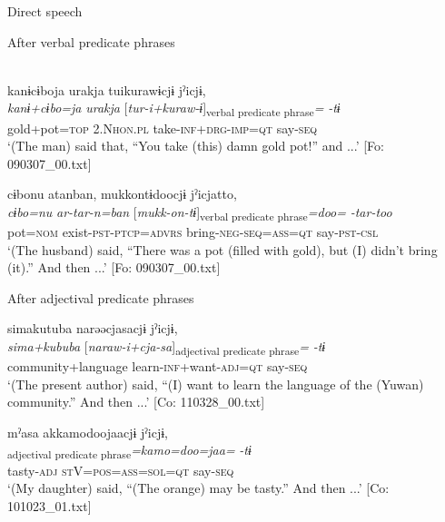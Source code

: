 \ea\label{ex:10.62}   Direct speech\\
  \begin{xlist}
  \exi{} After verbal predicate phrases

  \ex\relax [= (8-148 g)]\\
      \glll    kanɨcɨboja  urakja  tuikurawɨcjɨ  jˀicjɨ,\\
      \textit{kanɨ+cɨbo=ja}  \textit{urakja}  [\textit{tur-i+kuraw-ɨ}]\textsubscript{verbal predicate phrase}\textit{=}  \textit{-tɨ}\\
      gold+pot=\textsc{top}  2.N\textsc{hon}.\textsc{pl}  take-\textsc{inf}+\textsc{drg}-\textsc{imp}=\textsc{qt}  say-\textsc{seq}\\
      \glt       ‘(The man) said that, “You take (this) damn gold pot!” and ...’ [Fo: 090307\_00.txt]

  \ex %
      \glll    cɨbonu  atanban,  mukkontɨdoocjɨ     jˀicjatto,\\
      \textit{cɨbo=nu}  \textit{ar-tar-n=ban}  [\textit{mukk-on-tɨ}]\textsubscript{verbal predicate phrase}\textit{=doo=}   \textit{-tar-too}\\
      pot=\textsc{nom}  exist-\textsc{pst}-\textsc{ptcp}=\textsc{advrs}  bring-\textsc{neg}-\textsc{seq}=\textsc{ass}=\textsc{qt}   say-\textsc{pst}-\textsc{csl}\\
      \glt       ‘(The husband) said, “There was a pot (filled with gold), but (I) didn’t bring (it).” And then ...’ [Fo: 090307\_00.txt]

  \exi{} After adjectival predicate phrases

  \ex  %
      \glll    simakutuba  narəəcjasacjɨ  jˀicjɨ,\\
      \textit{sima+kububa}  [\textit{naraw-i+cja-sa}]\textsubscript{adjectival predicate phrase}\textit{=}  \textit{-tɨ}\\
      community+language  learn-\textsc{inf}+want-\textsc{adj}=\textsc{qt}  say-\textsc{seq}\\
      \glt       ‘(The present author) said, “(I) want to learn the language of the (Yuwan) community.” And then ...’ [Co: 110328\_00.txt]

  \ex  %
      \glll    mˀasa  akkamodoojaacjɨ  jˀicjɨ,\\
      [\textit{mˀa-sa}  \textit{ar}]\textsubscript{adjectival predicate phrase}\textit{=kamo=doo=jaa=}  \textit{-tɨ}\\
      tasty-\textsc{adj}  \textsc{st}V=\textsc{pos}=\textsc{ass}=\textsc{sol}=\textsc{qt}  say-\textsc{seq}\\
      \glt       ‘(My daughter) said, “(The orange) may be tasty.” And then ...’ [Co: 101023\_01.txt]


\end{xlist}
